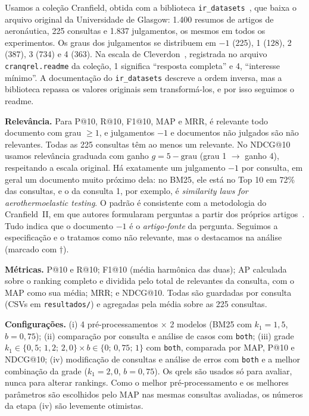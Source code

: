 \documentclass[10pt,a4paper]{article}
\newcommand{\term}[1]{\textit{#1}}      %
\begin{document}
Usamos a coleção Cranfield, obtida com a biblioteca \texttt{ir\_datasets}~\cite{irds}, que baixa o arquivo original da Universidade de Glasgow: 1.400 resumos de artigos de aeronáutica, 225 consultas e 1.837 julgamentos, os mesmos em todos os experimentos. Os graus dos julgamentos se distribuem em $-1$ (225), 1 (128), 2 (387), 3 (734) e 4 (363). Na escala de Cleverdon~\cite{cleverdon}, registrada no arquivo \texttt{cranqrel.readme} da coleção, 1 significa ``resposta completa'' e 4, ``interesse mínimo''. A documentação do \texttt{ir\_datasets} descreve a ordem inversa, mas a biblioteca repassa os valores originais sem transformá-los, e por isso seguimos o readme.

\textbf{Relevância.} Para P@10, R@10, F1@10, MAP e MRR, é relevante todo documento com grau $\geq1$, e julgamentos $-1$ e documentos não julgados são não relevantes. Todas as 225 consultas têm ao menos um relevante. No NDCG@10 usamos relevância graduada com ganho $g=5-\text{grau}$ (grau 1 $\to$ ganho 4), respeitando a escala original. Há exatamente um julgamento $-1$ por consulta, em geral um documento muito próximo dela: no BM25, ele está no Top 10 em 72\% das consultas, e o da consulta 1, por exemplo, é \term{similarity laws for aerothermoelastic testing}. O padrão é consistente com a metodologia do Cranfield~II, em que autores formularam perguntas a partir dos próprios artigos~\cite{cleverdon}. Tudo indica que o documento $-1$ é o \emph{artigo-fonte} da pergunta. Seguimos a especificação e o tratamos como não relevante, mas o destacamos na análise (marcado com $\dagger$).

\textbf{Métricas.} P@10 e R@10; F1@10 (média harmônica das duas); AP calculada sobre o ranking completo e dividida pelo total de relevantes da consulta, com o MAP como sua média; MRR; e NDCG@10. Todas são guardadas por consulta (CSVs em \texttt{resultados/}) e agregadas pela média sobre as 225 consultas.

\textbf{Configurações.} (i) 4 pré-processamentos $\times$ 2 modelos (BM25 com $k_1=1{,}5$, $b=0{,}75$); (ii) comparação por consulta e análise de casos com \texttt{both}; (iii) grade $k_1\in\{0{,}5;\,1{,}2;\,2{,}0\}\times b\in\{0;\,0{,}75;\,1\}$ com \texttt{both}, comparada por MAP, P@10 e NDCG@10; (iv) modificação de consultas e análise de erros com \texttt{both} e a melhor combinação da grade ($k_1=2{,}0$, $b=0{,}75$). Os qrels são usados só para avaliar, nunca para alterar rankings. Como o melhor pré-processamento e os melhores parâmetros são escolhidos pelo MAP nas mesmas consultas avaliadas, os números da etapa (iv) são levemente otimistas.
\end{document}
